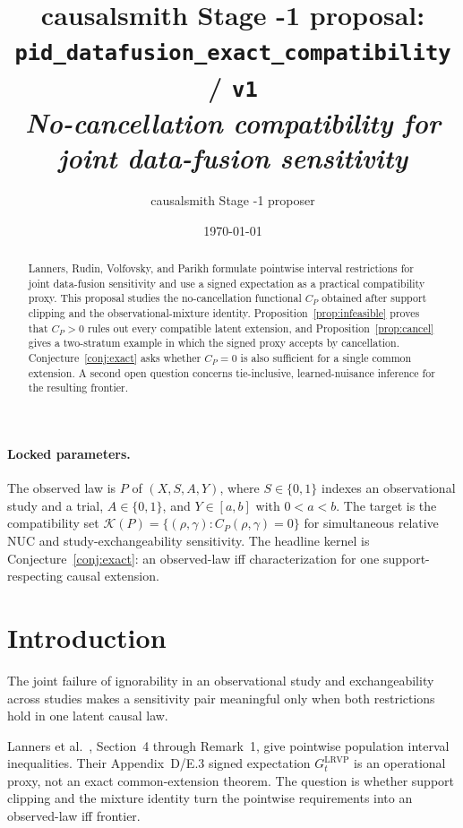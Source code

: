 \documentclass[11pt]{article}
\title{causalsmith Stage -1 proposal: \texttt{pid\_datafusion\_exact\_compatibility} / \texttt{v1}%
  \\ \large\textit{No-cancellation compatibility for joint data-fusion sensitivity}}
\author{causalsmith Stage -1 proposer}
\date{\today}
\theoremstyle{definition}
\theoremstyle{plain}
\theoremstyle{remark}
\begin{document}
\maketitle


\paragraph{Locked parameters.}
The observed law is $P$ of $(X,S,A,Y)$, where $S\in\{0,1\}$ indexes an observational study and a trial, $A\in\{0,1\}$, and $Y\in[a,b]$ with $0<a<b$.  The target is the compatibility set $\mathcal K(P)=\{(\rho,\gamma):C_P(\rho,\gamma)=0\}$ for simultaneous relative NUC and study-exchangeability sensitivity.  The headline kernel is Conjecture~\ref{conj:exact}: an observed-law iff characterization for one support-respecting causal extension.

\begin{abstract}
Lanners, Rudin, Volfovsky, and Parikh formulate pointwise interval restrictions for joint data-fusion sensitivity and use a signed expectation as a practical compatibility proxy.  This proposal studies the no-cancellation functional $C_P$ obtained after support clipping and the observational-mixture identity.  Proposition~\ref{prop:infeasible} proves that $C_P>0$ rules out every compatible latent extension, and Proposition~\ref{prop:cancel} gives a two-stratum example in which the signed proxy accepts by cancellation.  Conjecture~\ref{conj:exact} asks whether $C_P=0$ is also sufficient for a single common extension.  A second open question concerns tie-inclusive, learned-nuisance inference for the resulting frontier.
\end{abstract}

\section{Introduction}
The joint failure of ignorability in an observational study and exchangeability across studies makes a sensitivity pair meaningful only when both restrictions hold in one latent causal law.

Lanners et al.~\citep{LannersRudinVolfovskyParikh2025}, Section~4 through Remark~1, give pointwise population interval inequalities.  Their Appendix~D/E.3 signed expectation $G_t^{\mathrm{LRVP}}$ is an operational proxy, not an exact common-extension theorem.  The question is whether support clipping and the mixture identity turn the pointwise requirements into an observed-law iff frontier.
\end{document}
